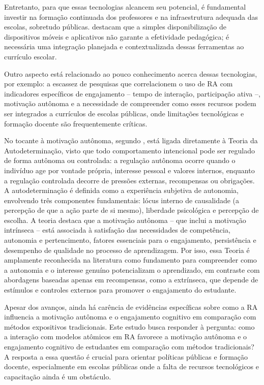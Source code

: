 \documentclass[portuguese]{textolivre}
\begin{document}
Entretanto, para que essas tecnologias alcancem seu potencial, é fundamental investir na formação continuada dos professores e na infraestrutura adequada das escolas, sobretudo públicas. \textcite{nascimento2016, nascimento2017} destacam que a simples disponibilização de dispositivos móveis e aplicativos não garante a efetividade pedagógica; é necessária uma integração planejada e contextualizada dessas ferramentas ao currículo escolar.

Outro aspecto está relacionado ao pouco conhecimento acerca dessas tecnologias, por exemplo: a escassez de pesquisas que correlacionem o uso de RA com indicadores específicos de engajamento -- tempo de interação, participação ativa --, motivação autônoma e a necessidade de compreender como esses recursos podem ser integrados a currículos de escolas públicas, onde limitações tecnológicas e formação docente são frequentemente críticas.

No tocante à motivação autônoma, segundo \textcite{deci2008}, está ligada diretamente à Teoria da Autodeterminação, visto que todo comportamento intencional pode ser regulado de forma autônoma ou controlada: a regulação autônoma ocorre quando o indivíduo age por vontade própria, interesse pessoal e valores internos, enquanto a regulação controlada decorre de pressões externas, recompensas ou obrigações. A autodeterminação é definida como a experiência subjetiva de autonomia, envolvendo três componentes fundamentais: lócus interno de causalidade (a percepção de que a ação parte de si mesmo), liberdade psicológica e percepção de escolha. A teoria destaca que a motivação autônoma -- que inclui a motivação intrínseca -- está associada à satisfação das necessidades de competência, autonomia e pertencimento, fatores essenciais para o engajamento, persistência e desempenho de qualidade no processo de aprendizagem. Por isso, essa Teoria é amplamente reconhecida na literatura como fundamento para compreender como a autonomia e o interesse genuíno potencializam o aprendizado, em contraste com abordagens baseadas apenas em recompensas, como a extrínseca, que depende de estímulos e controles externos para promover o engajamento do estudante.

Apesar dos avanços, ainda há carência de evidências específicas sobre como a RA influencia a motivação autônoma e o engajamento cognitivo em comparação com métodos expositivos tradicionais. Este estudo busca responder à pergunta: como a interação com modelos atômicos em RA favorece a motivação autônoma e o engajamento cognitivo de estudantes em comparação com métodos tradicionais? A resposta a essa questão é crucial para orientar políticas públicas e formação docente, especialmente em escolas públicas onde a falta de recursos tecnológicos e capacitação ainda é um obstáculo.
\end{document}
